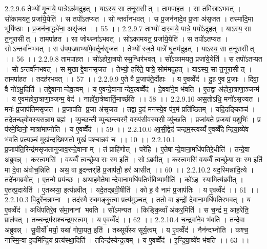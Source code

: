 2.2.9.6
तेभ्यो॑ मृ॒न्मये॒ पात्रेऽन्न॑मदुहत् । याऽस्य॒ सा त॒नूरासीत् । तामपा॑हत । सा तमि॑स्राऽभवत् । सो॑कामयत॒ प्रजा॑ये॒येति॑ । स तपो॑ऽतप्यत । सोन्तर्वा॑नभवत् । स प्र॒जन॑नादे॒व प्र॒जा अ॑सृजत । तस्मा॑दि॒मा भूयि॑ष्ठाः । प्र॒जन॑ना॒द्ध्ये॑ना॒ असृ॑जत ।। 55 ।।
2.2.9.7
ताभ्यो॑ दारु॒मये॒ पात्रे॒ पयो॑ऽदुहत् । याऽस्य॒ सा त॒नूरासीत् । तामपा॑हत । सा जोथ्स्ना॑ऽभवत् । सो॑ऽकामयत॒ प्रजा॑ये॒येति॑ । स तपो॑ऽतप्यत । सोऽन्तर्वा॑नभवत् । स उ॑पप॒ख्षाभ्या॑मे॒वर्तून॑सृजत । तेभ्यो॑ रज॒ते पात्रे॑ घृ॒तम॑दुहत् । याऽस्य॒ सा त॒नूरासीत् ।। 56 ।।
2.2.9.8
तामपा॑हत । सो॑ऽहोरा॒त्रयोस्स॒न्धिर॑भवत् । सो॑ऽकामयत॒ प्रजा॑ये॒येति॑ । स तपो॑ऽतप्यत । सोऽन्तर्वा॑नभवत् । स मुखाद्दे॒वान॑सृजत । तेभ्यो॒ हरि॑ते॒ पात्रे॒ सोम॑मदुहत् । याऽस्य॒ सा त॒नूरासीत् । तामपा॑हत । तदह॑रभवत् ।। 57 ।।
2.2.9.9
ए॒ते वै प्र॒जाप॑ते॒र्दोहाः । य ए॒वव्वेँद॑ । दु॒ह ए॒व प्र॒जाः । दिवा॒ वै नो॑ऽभू॒दिति॑ । तद्दे॒वानान्देव॒त्वम् । य ए॒वन्दे॒वानान्देव॒त्वव्वेँद॑ । दे॒ववा॑ने॒व भ॑वति । ए॒तद्वा अ॑होरा॒त्राणा॒ञ्जन्म॑ । य ए॒वम॑होरा॒त्राणा॒ञ्जन्म॒ वेद॑ । नाहो॑रा॒त्रेष्वार्ति॒मार्च्छ॑ति ।। 58 ।।
2.2.9.10
अस॒तोऽधि॒ मनो॑ऽसृज्यत । मनः॑ प्र॒जाप॑तिमसृजत । प्र॒जाप॑ति प्र॒जा अ॑सृजत । तद्वा इ॒दं मन॑स्ये॒व प॑र॒मं प्रति॑ष्ठितम् । यदि॒दङ्किञ्च॑ । तदे॒तच्छ्वो॑वस्य॒सन्नाम॒ ब्रह्म॑ । व्यु॒च्छन्तीव्युच्छन्त्यस्मै॒ वस्य॑सीवस्यसी॒ व्यु॑च्छति । प्रजा॑यते प्र॒जया॑ प॒शुभिः॑ । प्र प॑रमे॒ष्ठिनो॒ मात्रा॑माप्नोति । य ए॒वव्वेँद॑ ।। 59 ।।
2.2.10.0
आ॒सी॒द्वेद॑ चन्द्रम॒स्त्वय्यँ ए॒वव्वेँदेन्द्रिया॒व्ये॑व भ॑वति प्र॒त्यञ्चं॒ मुख॑न्दख्षिण॒तो मुखं॑ प॒श्चान्नव॑ च ।। 10 ।।
2.2.10.1
प्र॒जाप॑ति॒रिन्द्र॑मसृजतानुजाव॒रन्दे॒वानाम् । तं प्राहि॑णोत् । परे॑हि । ए॒तेषान्दे॒वाना॒मधि॑पतिरे॒धीति॑ । तन्दे॒वा अ॑ब्रुवन्न् । कस्त्वमसि॑ । व॒यव्वैँ त्वच्छ्रेया॑सः स्म॒ इति॑ । सोऽब्रवीत् । कस्त्वमसि॑ व॒यव्वैँ त्वच्छ्रेया॑सः स्म॒ इति॑ मा दे॒वा अ॑वोच॒न्निति॑ । अथ॒ वा इ॒दन्तर्‌हि॑ प्र॒जाप॑तौ॒ हर॑ आसीत् ।। 60 ।।
2.2.10.2
यद॒स्मिन्ना॑दि॒त्ये । तदे॑नमब्रवीत् । ए॒तन्मे॒ प्रय॑च्छ । अथा॒हमे॒तेषान्दे॒वाना॒मधि॑पतिर्भविष्या॒मीति॑ । को॑ऽह स्या॒मित्य॑ब्रवीत् । ए॒तत्प्र॒दायेति॑ । ए॒तथ्स्या॒ इत्य॑ब्रवीत् । यदे॒तद्ब्रवी॒षीति॑ । को ह॒ वै नाम॑ प्र॒जाप॑तिः । य ए॒वव्वेँद॑ ।। 61 ।।
2.2.10.3
वि॒दुरे॑न॒न्नाम्ना । तद॑स्मै रु॒क्मङ्कृ॒त्वा प्रत्य॑मुञ्चत् । ततो॒ वा इन्द्रो॑ दे॒वाना॒मधि॑पतिरभवत् । य ए॒वव्वेँद॑ । अधि॑पतिरे॒व स॑मा॒नानां भवति । सो॑ऽमन्यत । किङ्कि॒व्वाँ अ॑कर॒मिति॑ । स च॒न्द्रं म॒ आह॒रेति॒ प्राल॑पत् । तच्च॒न्द्रम॑सश्चन्द्रम॒स्त्वम् । य ए॒वव्वेँद॑ ।। 62 ।।
2.2.10.4
च॒न्द्रवा॑ने॒व भ॑वति । तन्दे॒वा अ॑ब्रुवन्न् । सु॒वीर्यो॑ मर्या॒ यथा॑ गोपा॒यत॒ इति॑ । तथ्सूर्य॑स्य सूर्य॒त्वम् । य ए॒वव्वेँद॑ । नैन॑न्दभ्नोति । कश्च॒ नास्मि॒न्वा इ॒दमि॑न्द्रि॒यं प्रत्य॑स्था॒दिति॑ । तदिन्द्र॑स्येन्द्र॒त्वम् । य ए॒वव्वेँद॑ । इ॒न्द्रि॒या॒व्ये॑व भ॑वति ।। 63 ।।
